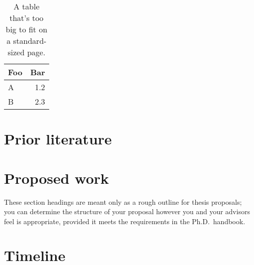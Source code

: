 \documentclass[draft]{ubcstatproposal} %
\begin{document}
\begin{landscapepage}
  \begin{table}
    \centering
    \begin{tabular}{l r}\toprule
      Foo & Bar \\\midrule
      A & 1.2\\
      B & 2.3\\\bottomrule
    \end{tabular}
    \caption[Demonstration extra-wide table]{A table that's too big to fit on a
      standard-sized page.}
    \label{jumbo-table}
  \end{table}
\end{landscapepage}

\section{Prior literature}

\section{Proposed work}

These section headings are meant only as a rough outline for thesis proposals;
you can determine the structure of your proposal however you and your advisors
feel is appropriate, provided it meets the requirements in the Ph.D.\ handbook.


\section{Timeline}


\end{document}
